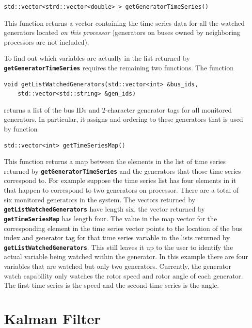\documentclass[12pt]{report} %
\begin{document}
{
\color{red}
\begin{Verbatim}[fontseries=b]
std::vector<strd::vector<double> > getGeneratorTimeSeries()
\end{Verbatim}
}

This function returns a vector containing the time series data for all the watched generators located \textit{on this processor} (generators on buses owned by neighboring processors are not included).

To find out which variables are actually in the list returned by \texttt{\textbf{getGeneratorTimeSeries}} requires the remaining two functions. The function

{
\color{red}
\begin{Verbatim}[fontseries=b]
void getListWatchedGenerators(std::vector<int> &bus_ids,
    std::vector<std::string> &gen_ids)
\end{Verbatim}
}

returns a list of the bus IDs and 2-character generator tags for all monitored generators. In particular, it assigns and ordering to these generators that is used by function

{
\color{red}
\begin{Verbatim}[fontseries=b]
std::vector<int> getTimeSeriesMap()
\end{Verbatim}
}

This function returns a map between the elements in the list of time series returned by \texttt{\textbf{getGeneratorTimeSeries}} and the generators that those time series correspond to. For example suppose the time series list has four elements in it that happen to correspond to two generators on processor. There are a total of six monitored generators in the system. The vectors returned by \texttt{\textbf{getListWatchedGenerators}} have length six, the vector returned by \texttt{\textbf{getTimeSeriesMap}} has length four. The value in the map vector for the corresponding element in the time series vector points to the location of the bus index and generator tag for that time series variable in the lists returned by \texttt{\textbf{getListWatchedGenerators}}. This still leaves it up to the user to identify the actual variable being watched within the generator. In this example there are four variables that are watched but only two generators. Currently, the generator watch capability only watches the rotor speed and rotor angle of each generator. The first time series is the speed and the second time series is the angle.

\section{Kalman Filter}
\end{document}
